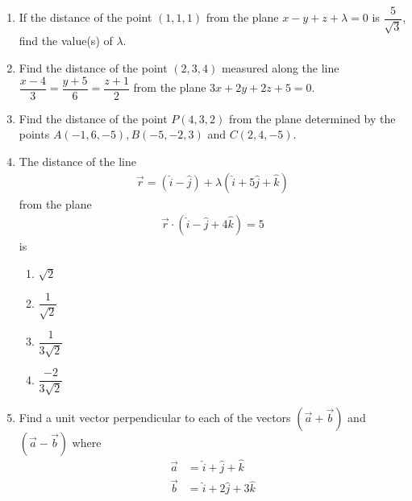 %
\begin{enumerate}

	\item If the distance of the point $(1,1,1)$ from the plane $x-y+z+\lambda=0$ is $\dfrac{5}{\sqrt{3}}$, find the value(s) of $\lambda$.

	\item Find the distance of the point $(2,3,4)$ measured along the line $\dfrac{x-4}{3}=\dfrac{y+5}{6}=\dfrac{z+1}{2}$ from the plane $3x+2y+2z+5=0$.

	\item Find the distance of the point $P(4,3,2)$ from the plane determined by the points $A(-1,6,-5),B(-5,-2,3)$ and $C(2,4,-5)$.

	\item The distance of the line
		\begin{align}
		\vec{r}=(\hat{i}-\hat{j})+\lambda(\hat{i}+5\hat{j}+\hat{k})\end{align}
		from the plane
		\begin{align}
		\vec{r}\cdot(\hat{i}-\hat{j}+4\hat{k})=5\end{align}
		is
		\begin{enumerate}
			\item $\sqrt{2}$
			\item $\dfrac{1}{\sqrt{2}}$
			\item $\dfrac{1}{3\sqrt{2}}$
			\item $\dfrac{-2}{3\sqrt{2}}$
		\end{enumerate}

	\item Find a unit vector perpendicular to each of the vectors $(\vec{a}+\vec{b})$ and $(\vec{a}-\vec{b})$ where 
	\begin{align}
		\vec{a}&=\hat{i}+\hat{j}+\hat{k}\\\vec{b}&=\hat{i}+2\hat{j}+3\hat{k}
	\end{align}
\end{enumerate}
%

